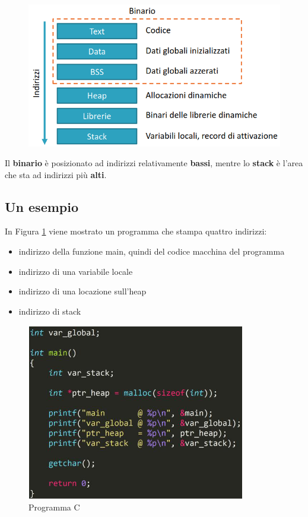 \begin{figure}[ht]
    \centering
    \includegraphics[width=0.75\linewidth]{images/linux-userspace.png}
\end{figure}

Il \textbf{binario} è posizionato ad indirizzi relativamente \textbf{bassi}, mentre lo
\textbf{stack} è l'area che sta ad indirizzi più \textbf{alti}.

\subsection{Un esempio}

In Figura \ref{fig:ex-c} viene mostrato un programma che stampa quattro indirizzi:
\begin{itemize}
    \item indirizzo della funzione main, quindi del codice macchina del programma
    \item indirizzo di una variabile locale
    \item indirizzo di una locazione sull'heap
    \item indirizzo di stack
\end{itemize}
 
\begin{figure}[ht]
    \centering
    \includegraphics[width=0.65\linewidth]{images/example-1.png}
    \caption{Programma C}
    \label{fig:ex-c}
\end{figure}

